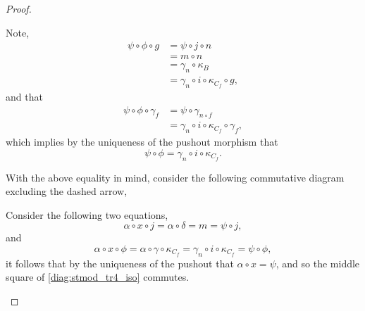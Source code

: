 \begin{proof}
\begin{enumerate}[label={(\bfseries TR\arabic*)}]
{            Note,
            \begin{align*}
                \psi \circ \phi \circ g &= \psi \circ j \circ n \\
                &= m \circ n \\
                &= \gamma_n \circ \kappa_B \\
                &= \gamma_n \circ i \circ \kappa_{C_f} \circ g,
            \end{align*}
            and that
            \begin{align*}
                \psi \circ \phi \circ \gamma_f &= \psi \circ \gamma_{n \circ f} \\
                &= \gamma_n \circ i \circ \kappa_{C_f} \circ \gamma_f,
            \end{align*}
            which implies by the uniqueness of the pushout morphism that
            \[
                \psi \circ \phi = \gamma_n \circ i \circ \kappa_{C_f}.
            \]

            With the above equality in mind, consider the following commutative diagram excluding the dashed arrow,
            \begin{center}
            \end{center}
            Consider the following two equations,
            \[
                \alpha \circ x \circ j = \alpha \circ \delta = m = \psi \circ j,
            \]
            and
            \[
                \alpha \circ x \circ \phi = \alpha \circ \gamma \circ \kappa_{C_f} = \gamma_n \circ i \circ \kappa_{C_f} = \psi \circ \phi,
            \]
            it follows that by the uniqueness of the pushout that \( \alpha \circ x = \psi \), and so the middle square of \autoref{diag:stmod_tr4_iso} commutes.
            
}
\end{enumerate}
\end{proof}
